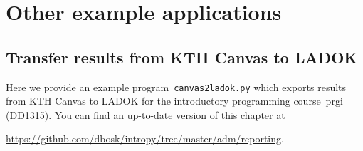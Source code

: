 \documentclass[a4paper,oneside]{book}
\begin{document}




\part{Other example applications}

\chapter{Transfer results from KTH Canvas to LADOK}

Here we provide an example program~\texttt{canvas2ladok.py} which exports 
results from KTH Canvas to LADOK for the introductory programming course~prgi 
(DD1315).
You can find an up-to-date version of this chapter at
\begin{center}
  \url{https://github.com/dbosk/intropy/tree/master/adm/reporting}.
\end{center}




\backmatter
\printbibliography
\end{document}
